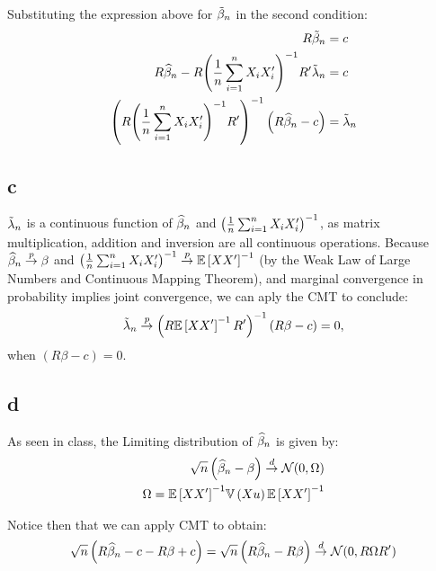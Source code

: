 \documentclass[12pt]{paper}
\begin{document}
Substituting the expression above for $\tilde{ \beta }_{n}$ in the second condition:
\begin{align*}
  R \tilde{ \beta }_{n} &= c\\
  R \widehat{ \beta }_{n} - R {\left( \frac{1}{n} \sum_{i=1}^n X_i X_i'  \right)}^{-1}
  R' \tilde{ \lambda }_{n} &= c\\
   { \left( R { \left( \frac{1}{n} \sum_{i=1}^n X_i
               X_i' \right)}^{-1} R' \right)}^{-1} \left(  R \widehat{ \beta }_{n} - c \right)
               &= \tilde{ \lambda }_{n}
\end{align*}


\subsection*{c}

$\tilde{ \lambda }_{n}$ is a continuous function of
$\widehat{ \beta }_{n}$ and ${\left( \frac{1}{n} \sum_{i=1}^n X_i X_i'  \right)}^{-1}$, as matrix multiplication, addition and inversion are all
continuous operations. Because $\widehat{ \beta }_{n} \overset{p}{\to} \beta$ and ${\left( \frac{1}{n} \sum_{i=1}^n X_i X_i'  \right)}^{-1}\overset{p}{\to}\mathbb{E} \left [ XX' \right ]^{-1}$ (by the
Weak Law of Large Numbers and Continuous Mapping Theorem), and marginal convergence in probability implies joint convergence, we can aply the CMT to conclude:
\begin{equation*}
  \tilde{ \lambda }_{n} \overset{p}{\to} { \left( R\mathbb{E} \left [ XX' \right ]^{-1}R' \right)}^{-1} \left(  R \beta - c \right) = 0,
\end{equation*}
when $\left(  R \beta - c \right) = 0$.

\subsection*{d}

As seen in class, the Limiting distribution of $\widehat{ \beta }_{n}$ is given by:
\begin{align*}
  \sqrt{n} \left(  \widehat{ \beta }_{n} - \beta \right) \overset{d}{\to} \mathcal{N}( 0, \Omega)\\
  \Omega = {\mathbb{E} \left [ XX' \right ]}^{-1} \mathbb{V} \left ( X u \right ) {\mathbb{E} \left [ XX' \right ]}^{-1}\\
\end{align*}

Notice then that we can apply CMT to obtain:
\begin{align*}
  \sqrt{n} \left(  R\widehat{ \beta }_{n}-c - R\beta +c\right) =\sqrt{n} \left(  R\widehat{ \beta }_{n} - R\beta \right) \overset{d}{\to} \mathcal{N}( 0, R\Omega R')\\
\end{align*}
\end{document}
